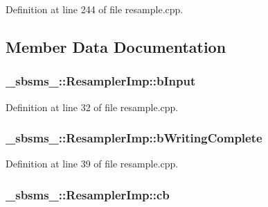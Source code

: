 Definition at line 244 of file resample.\+cpp.



\subsection{Member Data Documentation}
\subsubsection[{\texorpdfstring{b\+Input}{bInput}}]{ \+\_\+sbsms\+\_\+\+::\+Resampler\+Imp\+::b\+Input\hspace{0.3cm}{\ttfamily [protected]}}\hypertarget{class__sbsms___1_1_resampler_imp_a6c5b5954b1ff67b7cde1c8afe2d3dfd6}{}\label{class__sbsms___1_1_resampler_imp_a6c5b5954b1ff67b7cde1c8afe2d3dfd6}


Definition at line 32 of file resample.\+cpp.

\subsubsection[{\texorpdfstring{b\+Writing\+Complete}{bWritingComplete}}]{ \+\_\+sbsms\+\_\+\+::\+Resampler\+Imp\+::b\+Writing\+Complete\hspace{0.3cm}{\ttfamily [protected]}}\hypertarget{class__sbsms___1_1_resampler_imp_af2cd791c74515334ac808127c2331010}{}\label{class__sbsms___1_1_resampler_imp_af2cd791c74515334ac808127c2331010}


Definition at line 39 of file resample.\+cpp.

\subsubsection[{\texorpdfstring{cb}{cb}}]{ \+\_\+sbsms\+\_\+\+::\+Resampler\+Imp\+::cb\hspace{0.3cm}{\ttfamily [protected]}}\hypertarget{class__sbsms___1_1_resampler_imp_a71b316bd1ac799008bfe234216c24009}{}\label{class__sbsms___1_1_resampler_imp_a71b316bd1ac799008bfe234216c24009}


